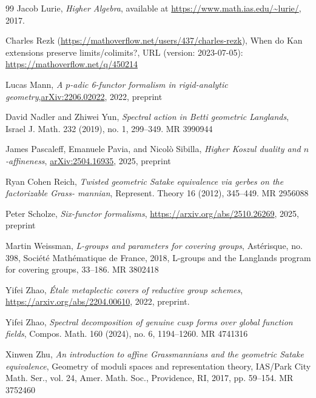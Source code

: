 \documentclass[10pt]{amsart}
\theoremstyle{remark}
\begin{document}
\begin{thebibliography}{99}
Jacob Lurie, \emph{Higher Algebra}, 
  available at \url{https://www.math.ias.edu/~lurie/}, 2017.

Charles Rezk (\url{https://mathoverflow.net/users/437/charles-rezk}), When do Kan extensions preserve limits/colimits?, URL (version: 2023-07-05): \url{https://mathoverflow.net/q/450214}

Lucas Mann, \emph{A $p$-adic 6-functor formalism in rigid-analytic geometry},\url{arXiv:2206.02022}, 2022, preprint

David Nadler and Zhiwei Yun, \emph{Spectral action in Betti geometric Langlands}, Israel J. Math. 232 (2019), no. 1, 299--349. MR 3990944



James Pascaleff, Emanuele Pavia, and Nicol{\`o} Sibilla, \emph{Higher Koszul duality and $n$-affineness}, \url{arXiv:2504.16935}, 2025, preprint

Ryan Cohen Reich, \emph{Twisted geometric Satake equivalence via gerbes on the factorizable Grass-
mannian}, Represent. Theory 16 (2012), 345--449. MR 2956088

Peter Scholze, \emph{Six-functor formalisms}, \url{https://arxiv.org/abs/2510.26269}, 2025, preprint

Martin Weissman, \emph{L-groups and parameters for covering groups}, Ast\'erisque, no. 398, Soci\'et\'e Math\'ematique
de France, 2018, L-groups and the Langlands program for covering groups, 33--186. MR 3802418

Yifei Zhao, \emph{\'Etale metaplectic covers of reductive group schemes}, \url{https://arxiv.org/abs/2204.00610}, 2022, preprint.

Yifei Zhao, \emph{Spectral decomposition of genuine cusp forms over global function fields}, Compos. Math. 160 (2024), no. 6, 1194--1260. MR 4741316

Xinwen Zhu, \emph{An introduction to affine Grassmannians and the geometric Satake equivalence}, Geometry
of moduli spaces and representation theory, IAS/Park City Math. Ser., vol. 24, Amer. Math. Soc.,
Providence, RI, 2017, pp. 59–154. MR 3752460
\end{thebibliography}
\end{document}
